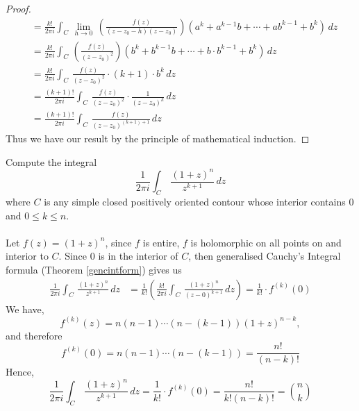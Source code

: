 \begin{proof}
\begin{align*}
 &= \frac{k!}{2\pi i}\int_C\,\lim_{h \to 0}\,\left(\frac{f(z)}{(z - z_0 - h)(z - z_0)}\right)(a^k + a^{k-1}b + \cdots + ab^{k-1} + b^k)\,dz \\[1em]
 &= \frac{k!}{2\pi i}\int_C\,\left(\frac{f(z)}{(z - z_0)^2}\right)(b^k + b^{k-1}b + \cdots + b\cdot b^{k-1} + b^k)\,dz\\[1em]
 &= \frac{k!}{2\pi i}\int_C\,\frac{f(z)}{(z - z_0)^2}\cdot(k+1)\cdot b^k\,dz \\[1em]
 &= \frac{(k+1)!}{2\pi i}\int_C\,\frac{f(z)}{(z - z_0)^2}\cdot\frac{1}{(z - z_0)^k}\,dz \\[1em]
 &= \frac{(k+1)!}{2\pi i}\int_C\,\frac{f(z)}{(z - z_0)^{(k+1)+1}}\,dz 
\end{align*}
Thus we have our result by the principle of mathematical induction. 
\end{proof}

\medskip

\begin{example}
Compute the integral
\[\frac{1}{2\pi i}\int_C\,\frac{(1 + z)^n}{z^{k+1}}\,dz\]
where $C$ is any simple closed positively oriented contour whose interior contains $0$ and $0 \leq k \leq n$.\\
\\
Let $f(z) = (1 + z)^n$, since $f$ is entire, $f$ is holomorphic on all points on and interior to $C$. Since $0$ is in the interior of $C$, then generalised Cauchy's Integral formula (Theorem \ref{gencintform}) gives us
\begin{align*}
\frac{1}{2\pi i}\int_C\,\frac{(1 + z)^n}{z^{k+1}}\,dz &= \frac{1}{k!}\left(\frac{k!}{2\pi i}\int_C\,\frac{(1 + z)^n}{(z - 0)^{k+1}}\,dz\right) = \frac{1}{k!}\cdot f^{(k)}(0)
\end{align*}
We have, 
\[f^{(k)}(z) = n(n-1)\cdots (n-(k-1))(1 + z)^{n-k},\]
and therefore
\[f^{(k)}(0) = n(n-1)\cdots (n-(k-1)) = \frac{n!}{(n-k)!}\]
Hence, 
\[\frac{1}{2\pi i}\int_C\,\frac{(1 + z)^n}{z^{k+1}}\,dz = \frac{1}{k!}\cdot f^{(k)}(0) = \frac{n!}{k!(n-k)!} = \binom{n}{k}\]
\end{example}

\medskip

